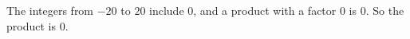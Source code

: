 The integers from $-20$ to $20$ include $0$, and a product with a factor $0$ is $0$. So the product is $\boxed{0}$.
